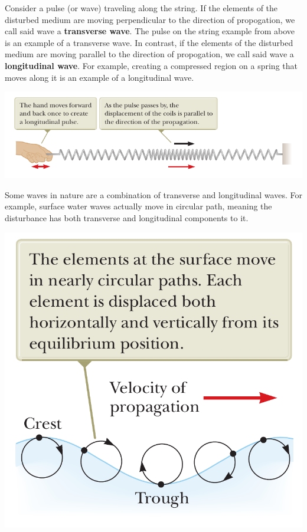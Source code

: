 Consider a pulse (or wave) traveling along the string. If the elements of the disturbed medium are
moving perpendicular to the direction of propogation, we call said wave a \textbf{transverse wave}.
The pulse on the string example from above is an example of a transverse wave.
In contrast, if the elements of the disturbed medium are moving parallel to the direction of propogation,
we call said wave a \textbf{longitudinal wave}. For example, creating a compressed region on a spring
that moves along it is an example of a longitudinal wave.
\begin{center}
    \includegraphics[scale=0.5]{images/oaw/pod02.png}
\end{center}

Some waves in nature are a combination of transverse and longitudinal waves. For example, surface 
water waves actually move in circular path, meaning the disturbance has both transverse and longitudinal
components to it.
\begin{center}
    \includegraphics[scale=0.2]{images/oaw/pod03.png}
\end{center}

